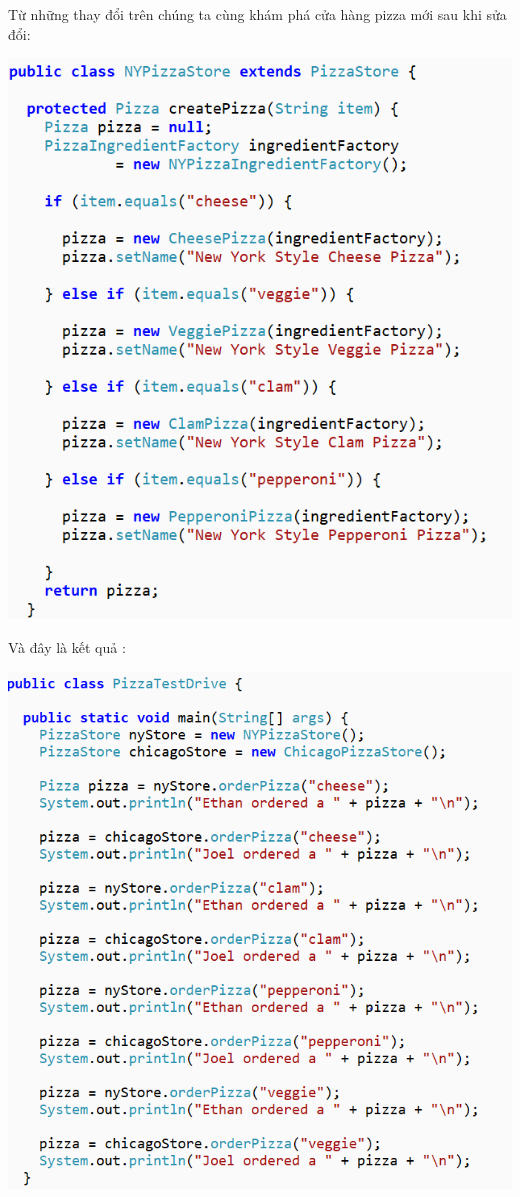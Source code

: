 Từ những thay đổi trên chúng ta cùng khám phá cửa hàng pizza mới sau khi sửa đổi:\\
\begin{center}
	\includegraphics[height=.55\textheight]{GALLEYS/images/chapter5/images15}
\end{center}
Và đây là kết quả :\\
\begin{center}
	\includegraphics{GALLEYS/images/chapter5/images16}
\end{center}
